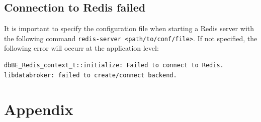 \subsection{Connection to Redis failed}
It is important to specify the configuration file when starting a Redis server with the following command \texttt{redis-server <path/to/conf/file>}.
If not specified, the following error will occurr at the application level: 
\begin{lstlisting}[style=mystyle,language=bash,basicstyle=\scriptsize\ttfamily,caption=Connection failed error, label=code:connerr]
dbBE_Redis_context_t::initialize: Failed to connect to Redis.
libdatabroker: failed to create/connect backend.
\end{lstlisting}


\section{Appendix}
